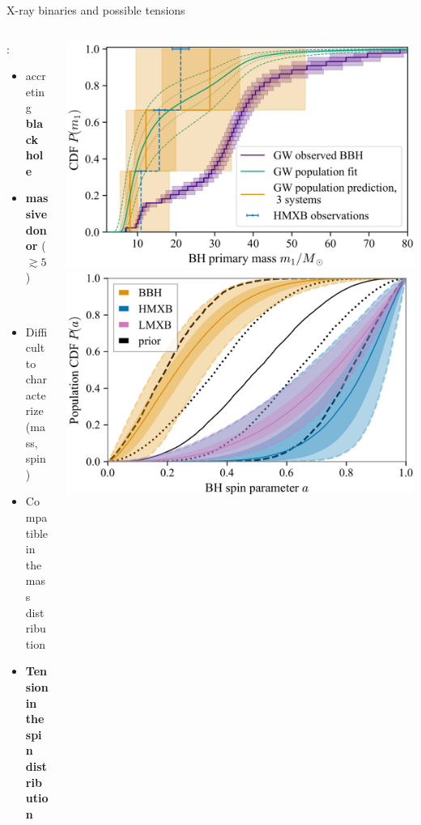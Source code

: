 \documentclass{beamer} %
\begin{document}
\begin{frame}[noframenumbering]{X-ray binaries and possible tensions}
	\begin{columns}
		\begin{column}{0.57\textwidth}
			\small
			:
			\begin{itemize}
				\item accreting \textbf{black hole}
				\item \textbf{massive donor} ($\gtrsim 5~M_\odot$)
			\end{itemize}
			\bigskip
			\bigskip
			\smallskip
			
			\\
			\begin{itemize}
				\item Difficult to characterize (mass, spin)
				\item Compatible in the mass distribution
				\item \textbf{Tension in the spin distribution}
			\end{itemize}
			\bigskip
			\bigskip
			\centering
		\end{column}
		\begin{column}{0.5\textwidth}
			\centering
			\includegraphics[width=.98\textwidth]{./images/tensionHMXBHmass.png}\acapo
			\includegraphics[width=.98\textwidth]{./images/tensionspin.png}
			\smallskip
		\end{column}	
	\end{columns}
\end{frame}
\end{document}
